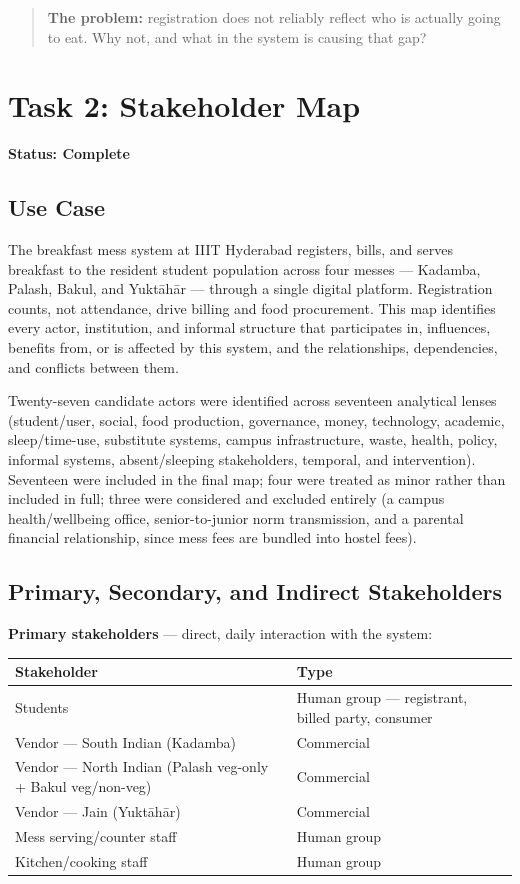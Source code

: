 \documentclass[11pt]{article}
\newcommand{\status}[1]{\noindent\textbf{Status: #1}\par\vspace{4pt}}
\begin{document}
\begin{quote}
\textbf{The problem:} registration does not reliably reflect who is actually going to
eat. Why not, and what in the system is causing that gap?
\end{quote}

\newpage

\section{Task 2: Stakeholder Map}
\status{Complete}

\subsection{Use Case}

The breakfast mess system at IIIT Hyderabad registers, bills, and serves breakfast to
the resident student population across four messes --- Kadamba, Palash, Bakul, and
Yukt\={a}h\={a}r --- through a single digital platform. Registration counts, not
attendance, drive billing and food procurement. This map identifies every actor,
institution, and informal structure that participates in, influences, benefits from,
or is affected by this system, and the relationships, dependencies, and conflicts
between them.

Twenty-seven candidate actors were identified across seventeen analytical lenses
(student/user, social, food production, governance, money, technology, academic,
sleep/time-use, substitute systems, campus infrastructure, waste, health, policy,
informal systems, absent/sleeping stakeholders, temporal, and intervention).
Seventeen were included in the final map; four were treated as minor rather than
included in full; three were considered and excluded entirely (a campus
health/wellbeing office, senior-to-junior norm transmission, and a parental financial
relationship, since mess fees are bundled into hostel fees).

\subsection{Primary, Secondary, and Indirect Stakeholders}

\textbf{Primary stakeholders} --- direct, daily interaction with the system:

\begin{longtable}{L{0.55\textwidth}L{0.35\textwidth}}
\toprule
\textbf{Stakeholder} & \textbf{Type} \\
\midrule
\endhead
Students & Human group --- registrant, billed party, consumer \\
Vendor --- South Indian (Kadamba) & Commercial \\
Vendor --- North Indian (Palash veg-only + Bakul veg/non-veg) & Commercial \\
Vendor --- Jain (Yukt\={a}h\={a}r) & Commercial \\
Mess serving/counter staff & Human group \\
Kitchen/cooking staff & Human group \\
\bottomrule
\end{longtable}
\end{document}
